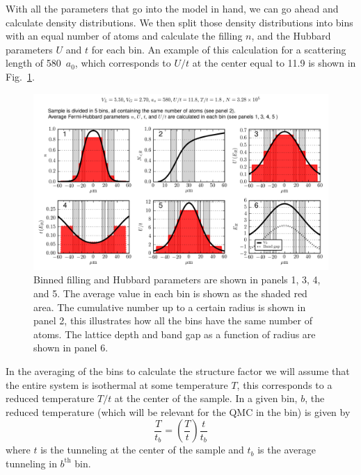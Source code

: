 \documentclass[11pt,letter]{article}
\begin{document}
With all the parameters that go into the model in hand, we can go ahead and
calculate density distributions.  We then split those density distributions
into bins with an equal number of atoms and calculate the filling $n$, and the
Hubbard parameters $U$ and $t$ for each bin.   An example of this calculation
for a scattering length of 580~$a_{0}$, which corresponds to $U/t$ at the
center equal to 11.9 is shown in Fig.~\ref{fig:bin-580a0}.
\begin{figure}
\centering
\includegraphics[width=\textwidth]{figures_140130/111_0580a0.png}
\caption[Binned density distribution]{\small Binned filling and Hubbard
parameters are shown in panels 1, 3, 4, and 5. The average value in each bin is
shown as the shaded red area. The cumulative number up to a certain radius is
shown in panel 2,  this illustrates how all the bins have the same number of
atoms.  The lattice depth and band gap as a function of radius are shown in
panel 6. }
\label{fig:bin-580a0} 
\end{figure} 

In the averaging of the bins to calculate the structure factor we will assume
that the entire system is isothermal at some temperature $T$,  this corresponds
to a reduced temperature $T/t$ at the center of the sample.  In a given bin,
$b$,  the reduced temperature (which will be relevant for the QMC in the bin)
is given by \[  \frac{T}{t_{b}} = \left( \frac{T}{t} \right) \frac{t}{t_{b}} \]
where $t$ is the tunneling at the center of the sample and $t_{b}$ is the
average tunneling in $b^{\mathrm{th}}$ bin.
\end{document}
